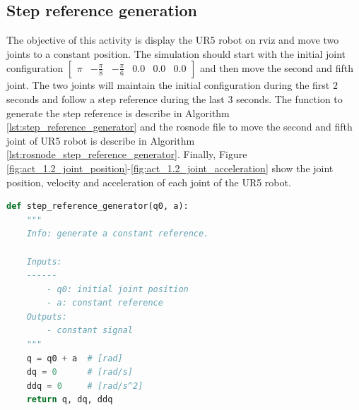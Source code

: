 \subsection{Step reference generation}
The objective of this activity is display the UR5 robot on rviz and move two joints to a constant position. The simulation should start with the initial joint configuration $\begin{bmatrix} \pi & -\frac{\pi}{8} & -\frac{\pi}{6} & 0.0 & 0.0 & 0.0 \end{bmatrix}$ and then move the second and fifth joint. The two joints will maintain the initial configuration during the first $2$ seconds and follow a step reference during the last $3$ seconds. The function to generate the step reference is describe in Algorithm \ref{lst:step_reference_generator} and the rosnode file to move the second and fifth joint of UR5 robot is describe in Algorithm \ref{lst:rosnode_step_reference_generator}. Finally, Figure \ref{fig:act_1.2_joint_position}-\ref{fig:act_1.2_joint_acceleration} show the joint position, velocity and acceleration of each joint of the UR5 robot.

\begin{lstlisting}[language=Python,caption=Function to generate step reference., label={lst:step_reference_generator}]
def step_reference_generator(q0, a):
    """
    Info: generate a constant reference.

    Inputs:
    ------
        - q0: initial joint position
        - a: constant reference
    Outputs:
        - constant signal 
    """
    q = q0 + a  # [rad]
    dq = 0      # [rad/s]
    ddq = 0     # [rad/s^2]
    return q, dq, ddq
\end{lstlisting}



